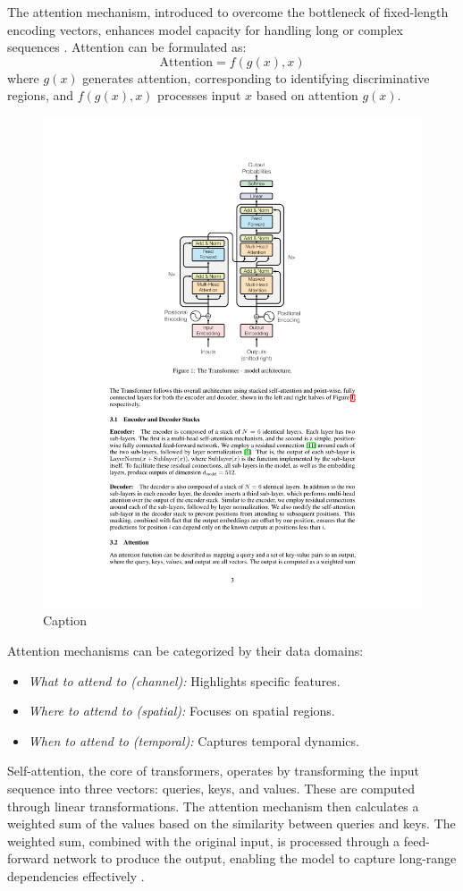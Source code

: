 The attention mechanism, introduced to overcome the bottleneck of fixed-length encoding vectors, enhances model capacity for handling long or complex sequences \cite{DBLP:journals/corr/VaswaniSPUJGKP17}. Attention can be formulated as:
\begin{equation}
\text{Attention} = f(g(x), x)
\end{equation}
where \( g(x) \) generates attention, corresponding to identifying discriminative regions, and \( f(g(x), x) \) processes input \( x \) based on attention \( g(x) \).
\begin{figure}[H]
    \centering
    \includegraphics[width=0.5\linewidth]{LateX/figs/attention_transformer_architecture.pdf}
    \caption{Caption}
    \label{fig:enter-label}
\end{figure}

Attention mechanisms can be categorized by their data domains:
\begin{itemize}
    \item \textit{What to attend to (channel):} Highlights specific features.
    \item \textit{Where to attend to (spatial):} Focuses on spatial regions.
    \item \textit{When to attend to (temporal):} Captures temporal dynamics.
\end{itemize}

Self-attention, the core of transformers, operates by transforming the input sequence into three vectors: queries, keys, and values. These are computed through linear transformations. The attention mechanism then calculates a weighted sum of the values based on the similarity between queries and keys. The weighted sum, combined with the original input, is processed through a feed-forward network to produce the output, enabling the model to capture long-range dependencies effectively \cite{ramachandran2019standalone}.




